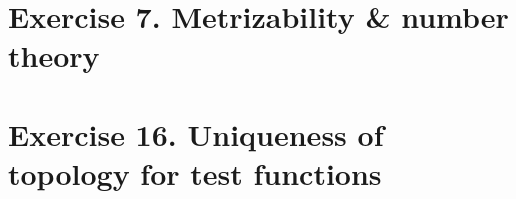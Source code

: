 %
%
\newpage
\section{Exercise 7. Metrizability \& number theory}

%
%
%
\newpage
\section{Exercise 16. Uniqueness of topology for test functions}

%